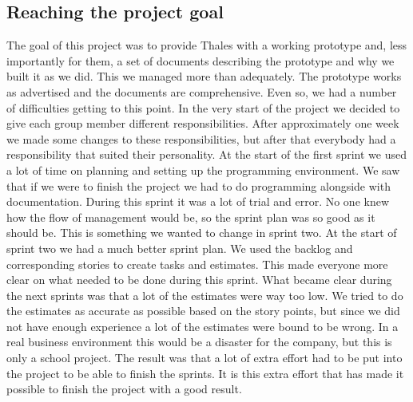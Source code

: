 \subsection{Reaching the project goal}
The goal of this project was to provide Thales with a working prototype and, less importantly for them, a set of documents describing the prototype and why we built it as we did. This we managed more than adequately. The prototype works as advertised and the documents are comprehensive. Even so, we had a number of difficulties getting to this point.
\newline
\newline
In the very start of the project we decided to give each group member different responsibilities. After approximately one week we made some changes to these responsibilities, but after that everybody had a responsibility that suited their personality.
\newline
\newline
At the start of the first sprint we used a lot of time on planning and setting up the programming environment. We saw that if we were to finish the project we had to do programming alongside with documentation. During this sprint it was a lot of trial and error. No one knew how the flow of management would be, so the sprint plan was so good as it should be. This is something we wanted to change in sprint two.
\newline
\newline
At the start of sprint two we had a much better sprint plan. We used the backlog and corresponding stories to create tasks and estimates. This made everyone more clear on what needed to be done during this sprint.
\newline
\newline
What became clear during the next sprints was that a lot of the estimates were way too low. We tried to do the estimates as accurate as possible based on the story points, but since we did not have enough experience a lot of the estimates were bound to be wrong. In a real business environment this would be a disaster for the company, but this is only a school project. The result was that a lot of extra effort had to be put into the project to be able to finish the sprints. It is this extra effort that has made it possible to finish the project with a good result. 

